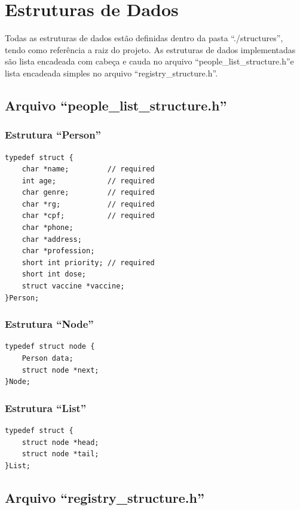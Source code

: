 \documentclass[12pt, a4paper]{article}
\newcommand{\prof}{Rômulo César Silva}
\begin{document}
\pagestyle{fancy}
\fancyfoot[L]{}
\fancyhead[L]{}
\fancyhead[R]{}

\tableofcontents
\newpage

\section{Estruturas de Dados}\label{Estruturas de Dados}
Todas as estruturas de dados estão definidas dentro da pasta ``./structures'', tendo como referência a raiz do projeto. As estruturas de dados implementadas são lista encadeada com cabeça e cauda no arquivo ``people\_list\_structure.h''e lista encadeada simples no arquivo ``registry\_structure.h''.
\subsection{Arquivo ``people\_list\_structure.h''}\label{Arquivo``peoplelist.h''}
\subsubsection{Estrutura ``Person''}\label{Estrutura ``Person''}

\begin{lstlisting}
typedef struct {
    char *name;         // required
    int age;            // required
    char genre;         // required
    char *rg;           // required
    char *cpf;          // required
    char *phone;
    char *address;
    char *profession;
    short int priority; // required
    short int dose;
    struct vaccine *vaccine;
}Person;
\end{lstlisting}
\subsubsection{Estrutura ``Node''}\label{Estrutura ``Node''}
\begin{lstlisting}
typedef struct node {
    Person data;
    struct node *next;
}Node;
\end{lstlisting}
\subsubsection{Estrutura ``List''}\label{Estrutura ``List''}
\begin{lstlisting}
typedef struct {
    struct node *head;
    struct node *tail;
}List;
\end{lstlisting}
\subsection{Arquivo ``registry\_structure.h''}\label{Arquivo ``registry''}
\end{document}
